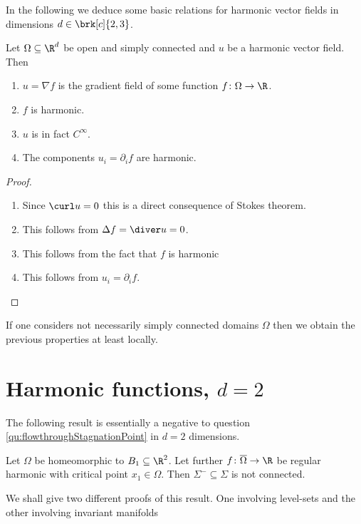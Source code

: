 In the following we deduce some basic relations for harmonic vector fields in dimensions $d\in\brk[c]{2,3}$.
\begin{proposition}\label{pr:n2:hvf:simplyConnected}
  Let $\Omega\subseteq\R^d$ be open and simply connected and $u$ be a harmonic vector field. Then
  \begin{enumerate}
    \item 
    $u=\nabla f$ is the gradient field of some
    function $f\colon\Omega\to\R$.
    \item  $f$ is harmonic.
    \item $u$ is in fact $C^\infty$.
    \item The components $u_i=\partial_if$ are harmonic.
  \end{enumerate}
\end{proposition}
\begin{proof}
  \begin{enumerate}
    \item 
    Since $\curl u =0$ this is a direct consequence of Stokes theorem.
    \item This follows from $\Delta f = \diver u=0$.
    \item This follows from the fact that $f$ is harmonic
    \item This follows from $u_i=\partial_if$.
  \end{enumerate}
\end{proof}

If one considers not necessarily simply connected domains $\Omega$ then we obtain the previous
properties at least locally.

\newpage

\chapter{Harmonic functions, $d=2$}

The following result is essentially a negative to question \ref{qu:flowthroughStagnationPoint} in $d=2$ dimensions.
\begin{proposition}\label{pr:n2:hf:nonExistence}
  Let $\Omega$ be homeomorphic to $B_1\subseteq\R^2$. Let further $f\colon\overline{\Omega}\to\R$ be regular harmonic  
  with critical point $x_1\in\Omega$. Then $\Sigma^-\subseteq\Sigma$ is not connected.
\end{proposition}
We shall give two different proofs of this result. One involving level-sets and the other involving invariant manifolds

